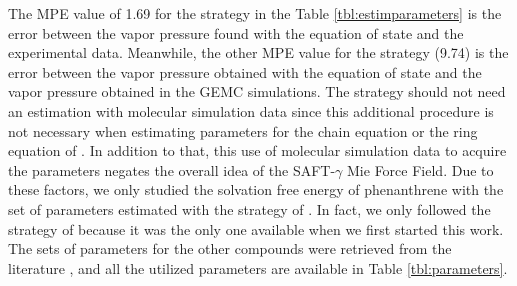 The MPE value of 1.69 for the  strategy in the Table \ref{tbl:estimparameters} is the error between the vapor pressure found with the equation of state and the experimental data. Meanwhile, the other MPE value for the  strategy (9.74) is the error between the vapor pressure obtained with the equation of state and the vapor pressure obtained in the GEMC simulations. The  strategy should not need an estimation with molecular simulation data since this additional procedure is not necessary when estimating parameters for the chain equation \cite{avendano2011} or the ring equation of . In addition to that, this use of molecular simulation data to acquire the parameters negates the overall idea of the SAFT-$\gamma$ Mie Force Field. Due to these factors, we only studied the solvation free energy of phenanthrene with the set of parameters estimated with the strategy of . In fact, we only followed the strategy of  because it was the only one available when we first started this work. The sets of parameters for the other compounds were retrieved from the literature \cite{lobanova2016,herdes2015,ervik2016,muller2017}, and all the utilized parameters are available in Table \ref{tbl:parameters}.

